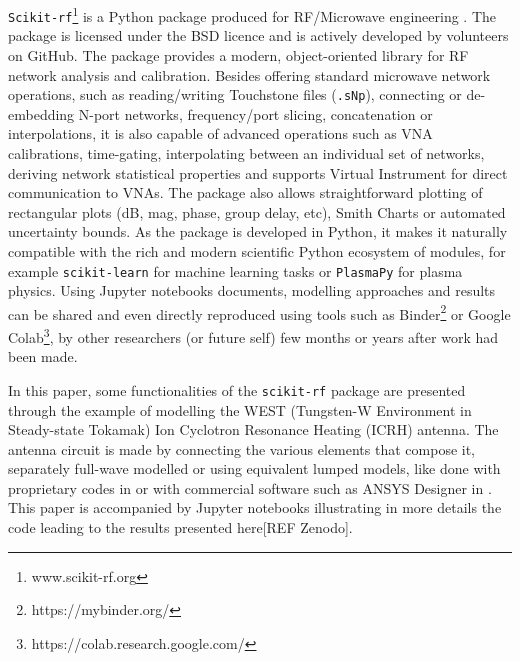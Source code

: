 \documentclass{aip-cp}
\begin{document}
	\texttt{Scikit-rf}\footnote{www.scikit-rf.org} is a Python package produced for RF/Microwave engineering  \cite{Arsenovic2018}. The package is licensed under the BSD licence and is actively developed by volunteers on GitHub. The package provides a modern, object-oriented library for RF network analysis and calibration. Besides offering standard microwave network operations, such as reading/writing Touchstone files (\texttt{.sNp}), connecting or de-embedding N-port networks, frequency/port slicing, concatenation or interpolations, it is also capable of advanced operations such as VNA calibrations, time-gating, interpolating between an individual set of networks, deriving network statistical properties and supports Virtual Instrument for direct communication to VNAs. The package also allows straightforward plotting of rectangular plots (dB, mag, phase, group delay, etc), Smith Charts or automated uncertainty bounds. As the package is developed in Python, it makes it naturally compatible with the rich and modern scientific Python ecosystem of modules\cite{Millman2011}, for example  \texttt{scikit-learn} for machine learning tasks \cite{scikit-learn} or \texttt{PlasmaPy} \cite{PlasmaPyCommunity2018} for plasma physics. Using Jupyter notebooks documents\cite{Kluyver2016}, modelling approaches and results can be shared and even directly reproduced using tools such as Binder\footnote{https://mybinder.org/} or Google Colab\footnote{https://colab.research.google.com/}, by other researchers (or future self) few months or years after work had been made.
	
	In this paper, some functionalities of the \texttt{scikit-rf} package are presented through the example of modelling the WEST (Tungsten-W Environment in Steady-state Tokamak) Ion Cyclotron Resonance Heating (ICRH) antenna. The antenna circuit is made by connecting the various elements that compose it, separately full-wave modelled or using equivalent lumped models, like done with proprietary codes in \cite{Durodie2015, Helou2015_SIDON} or with commercial software such as ANSYS Designer in \cite{Hillairet2015}. This paper is accompanied by Jupyter notebooks illustrating in more details the code leading to the results presented here[REF Zenodo].
	
	
	
\end{document}
